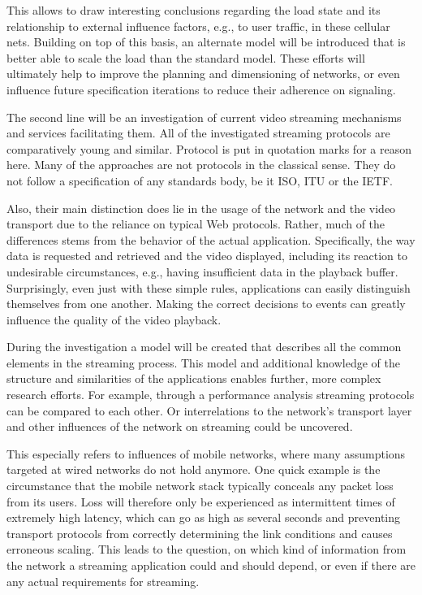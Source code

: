 This allows to draw interesting conclusions regarding the load state and its relationship to external influence factors, e.g., to user traffic, in these cellular nets. Building on top of this basis, an alternate model will be introduced that is better able to scale the load than the standard model. These efforts will ultimately help to improve the planning and dimensioning of networks, or even influence future specification iterations to reduce their adherence on signaling.



The second line will be an investigation of current video streaming mechanisms and services facilitating them. All of the investigated streaming protocols are comparatively young and similar. Protocol is put in quotation marks for a reason here. Many of the approaches are not protocols in the classical sense. They do not follow a specification of any standards body, be it \gls{ISO}, \gls{ITU} or the \gls{IETF}. 

Also, their main distinction does lie in the usage of the network and the video transport due to the reliance on typical Web protocols. Rather, much of the differences stems from the behavior of the actual application. Specifically, the way data is requested and retrieved and the video displayed, including its reaction to undesirable circumstances, e.g., having insufficient data in the playback buffer. Surprisingly, even just with these simple rules, applications can easily distinguish themselves from one another. Making the correct decisions to events can greatly influence the quality of the video playback. 

During the investigation a model will be created that describes all the common elements in the streaming process. This model and additional knowledge of the structure and similarities of the applications enables further, more complex research efforts. For example, through a performance analysis streaming protocols can be compared to each other. Or interrelations to the network's transport layer and other influences of the network on streaming could be uncovered. 

This especially refers to influences of mobile networks, where many assumptions targeted at wired networks do not hold anymore. One quick example is the circumstance that the mobile network stack typically conceals any packet loss from its users. Loss will therefore only be experienced as  intermittent times of extremely high latency, which can go as high as several seconds and preventing transport protocols from correctly determining the link conditions and causes erroneous scaling.
This leads to the question, on which kind of information from the network a streaming application could and should depend, or even if there are any actual requirements for streaming.

